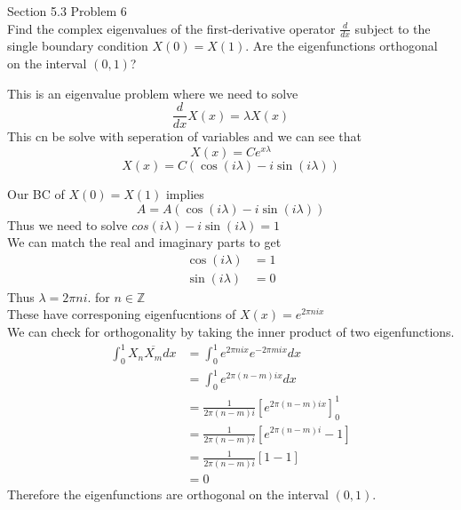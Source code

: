 \documentclass[answers,12pt,addpoints]{exam}
\begin{document}
\begin{questions}
    \question Section 5.3 Problem 6\\
    Find the complex eigenvalues of the first-derivative operator \(\frac{d}{dx}\) subject to the single boundary condition \(X(0) = X(1)\). Are the eigenfunctions orthogonal on the interval \((0,1)\)?
    \begin{solution}
        This is an eigenvalue problem where we need to solve 
        $$\frac{d}{dx}X(x) = \lambda X(x)$$
        This cn be solve with seperation of variables and we can see that 
        $$ X(x) = C e^{x\lambda}$$
        $$ X(x) = C (\cos(i\lambda) - i\sin(i\lambda))$$
    \end{solution}
    Our BC of $X(0) = X(1)$ implies
    $$ A = A(\cos(i\lambda) - i\sin(i\lambda))$$
    Thus we need to solve $cos(i\lambda) - i\sin(i\lambda) = 1$\\
    We can match the real and imaginary parts to get
    \begin{align*}
        \cos(i\lambda) &= 1\\
        \sin(i\lambda) &= 0
    \end{align*}
    Thus $\lambda = 2\pi n i$. for $n \in \mathbb{Z}$\\
    These have corresponing eigenfucntions of $X(x) = e^{2\pi n i x}$\\
    We can check for orthogonality by taking the inner product of two eigenfunctions.\\
    \begin{align*}
        \int_0^1 X_n \overline{X_m} dx &= \int_0^1 e^{2\pi n i x} e^{-2\pi m i x} dx\\
        &= \int_0^1 e^{2\pi (n-m) i x} dx\\
        &= \frac{1}{2\pi (n-m) i} [e^{2\pi (n-m) i x}]_0^1\\
        &= \frac{1}{2\pi (n-m) i} [e^{2\pi (n-m) i} - 1]\\
        &= \frac{1}{2\pi (n-m) i} [1 - 1]\\
        &= 0
    \end{align*}
    Therefore the eigenfunctions are orthogonal on the interval $(0,1)$.
\end{questions}
\end{document}
